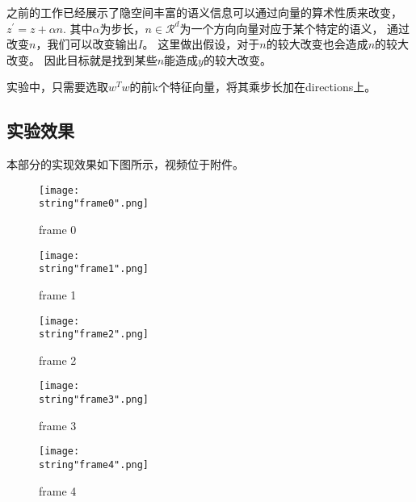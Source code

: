 \documentclass[UTF8]{ctexart}
\begin{document}
之前的工作已经展示了隐空间丰富的语义信息可以通过向量的算术性质来改变，$z^{'}=z+{\alpha}n$.
其中$\alpha$为步长，$n{\in}\mathcal{R}^{d}$为一个方向向量对应于某个特定的语义，
通过改变$n$，我们可以改变输出$I$。
这里做出假设，对于$n$的较大改变也会造成$n$的较大改变。
因此目标就是找到某些$n$能造成$y$的较大改变。\par 
实验中，只需要选取$w^{T}w$的前k个特征向量，将其乘步长加在directions上。

\subsection{实验效果}
本部分的实现效果如下图所示，视频位于附件。
\begin{figure}[H]
    \begin{center}
        \texttt{[image: \\string"frame0".png]}
    \caption{frame 0}
    \label{fig:9}
    \end{center}
    \end{figure}
\par
\begin{figure}[H]
    \begin{center}
        \texttt{[image: \\string"frame1".png]}
    \caption{frame 1}
    \label{fig:10}
    \end{center}
    \end{figure}
\par
\begin{figure}[H]
    \begin{center}
        \texttt{[image: \\string"frame2".png]}
    \caption{frame 2}
    \label{fig:11}
    \end{center}
    \end{figure}
\par
\begin{figure}[H]
    \begin{center}
        \texttt{[image: \\string"frame3".png]}
    \caption{frame 3}
    \label{fig:12}
    \end{center}
    \end{figure}
\par
\begin{figure}[H]
    \begin{center}
        \texttt{[image: \\string"frame4".png]}
    \caption{frame 4}
    \label{fig:13}
    \end{center}
    \end{figure}
\par



 

\end{document}
